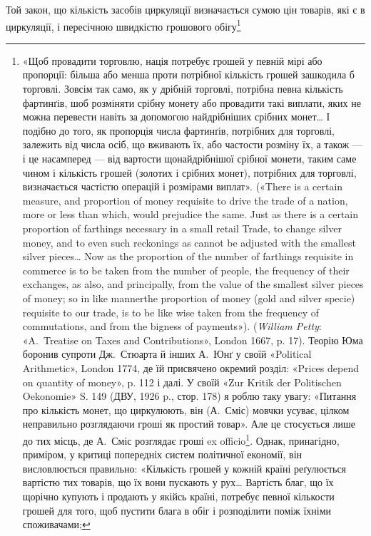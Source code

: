 Той закон, що кількість засобів циркуляції визначається
сумою цін товарів, які є в циркуляції, і пересічною швидкістю
грошового обігу\footnote{
«Щоб провадити торговлю, нація потребує грошей у певній мірі
або пропорції: більша або менша проти потрібної кількість грошей зашкодила
б торговлі. Зовсім так само, як у дрібній торговлі, потрібна певна
кількість фартинґів, шоб розміняти срібну монету або провадити такі
виплати, яких не можна перевести навіть за допомогою найдрібніших
срібних монет\dots{} І подібно до того, як пропорція числа фартинґів, потрібних
для торговлі, залежить від числа осіб, що вживають їх, або частости
розміну їх, а також — і це насамперед — від вартости щонайдрібнішої
срібної монети, таким саме чином і кількість грошей (золотих і срібних
монет), потрібних для торговлі, визначається частістю операцій і розмірами
виплат». («There is a certain measure, and proportion of money requisite
to drive the trade of a nation, more or less than which, would prejudice
the same. Just as there is a certain proportion of farthings necessary in a
small retail Trade, to change silver money, and to even such reckonings
as cannot be adjusted with the smallest silver pieces\dots{} Now as the proportion
of the number of farthings requisite in commerce is to be taken from
the number of people, the frequency of their exchanges, as also, and principally,
from the value of the smallest silver pieces of money; so in like mannerthe
proportion of money (gold and silver specie) requisite to our trade,
is to be like wise taken from the frequency of commutations, and from
the bigness of payments»). (\emph{William Petty}: «A.~Treatise on Taxes and
Contributions», London 1667, p. 17). Теорію Юма боронив супроти
Дж.~Стюарта й інших А.~Юнґ у своїй «Political Arithmetic», London
1774, де їй присвячено окремий розділ: «Prices depend on quantity of
money», p. 112 і далі. У своїй «Zur Kritik der Politischen Oekonomie»
S. 149 (ДВУ, 1926 p., стор. 178) я роблю таку увагу: «Питання про кількість
монет, що циркулюють, він (А.~Сміс) мовчки усуває, цілком неправильно
розглядаючи гроші як простий товар». Але це стосується лише
до тих місць, де А.~Сміс розглядає гроші ex officio\footnote*{
— з обов’язку. \emph{Peд.}
}. Однак, принагідно,
приміром, у критиці попередніх систем політичної економії, він висловлюється
правильно: «Кількість грошей у кожній країні реґулюється вартістю
тих товарів, що їх вони пускають у рух\dots{} Вартість благ, що їх щорічно
купують і продають у якійсь країні, потребує певної кількости грошей
для того, щоб пустити блага в обіг і розподілити поміж їхніми споживачами;
}
